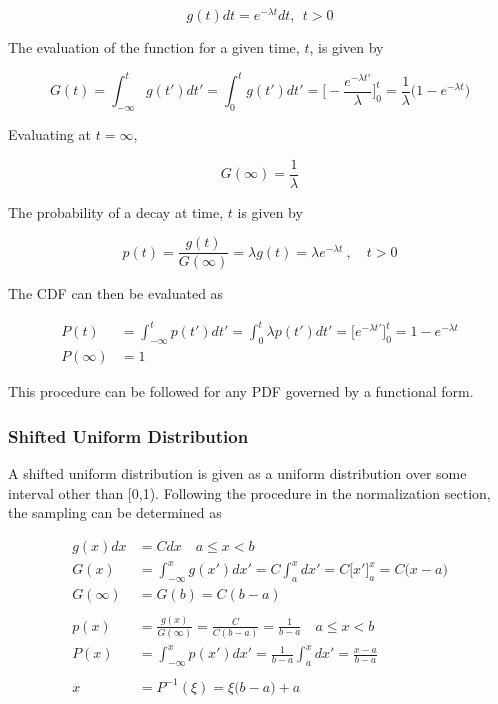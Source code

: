 \documentclass[12pt]{article}
\begin{document}
\begin{equation*}
  g(t)dt = e^{-\lambda t}dt, \:\: t>0
\end{equation*}

The evaluation of the function for a given time, $t$, is given by

\begin{equation*}
  G(t) = \int_{-\infty}^t g(t')dt' = \int_0^t g(t') dt' = \biggl[- \frac{e^{-\lambda t'}}{\lambda} \biggr]_0^t = \frac{1}{\lambda} \bigl(1 - e^{-\lambda t}\bigr)
\end{equation*}

Evaluating at $t=\infty$,

\begin{equation*}
  G(\infty) = \frac{1}{\lambda}
\end{equation*}

The probability of a decay at time, $t$ is given by

\begin{equation*}
  p(t) = \frac{g(t)}{G(\infty)}= \lambda g(t) = \lambda e^{-\lambda t} \:, \quad t > 0
\end{equation*}

The CDF can then be evaluated as

\begin{align*}
    P(t) &= \int_{-\infty}^t p(t')dt' = \int_0^t \lambda p(t') dt' = \bigl[e^{-\lambda t'} \bigr]_0^t = 1 - e^{-\lambda t}\\
    P(\infty) &= 1
\end{align*}

This procedure can be followed for any PDF governed by a functional form.

\subsubsection*{Shifted Uniform Distribution}

A shifted uniform distribution is given as a uniform distribution over some interval other than [0,1).  
Following the procedure in the normalization section, the sampling can be determined as

\begin{align*}
  g(x) dx &= Cdx \quad a \leq x < b\\
  G(x) &= \int_{-\infty}^x g(x')dx' = C \int_a^x dx' = C\bigl[x' \bigr]_a^x = C \bigl(x - a)\\
  G(\infty) &= G(b) = C(b-a)\\  
  & \\
  p(x) &= \frac{g(x)}{G(\infty)} = \frac{C}{C(b-a)} = \frac{1}{b-a} \quad a \leq x < b\\
  P(x) &= \int_{-\infty}^x p(x')dx' = \frac{1}{b-a}\int_a^x dx' = \frac{x-a}{b-a}\\
  &\\ 
  x &= P^{-1}(\xi) = \xi\bigl(b-a\bigr) + a
\end{align*}
\end{document}
